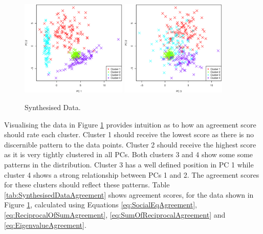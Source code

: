 			\begin{figure}[h!]
				\centering
				\subfloat
				{
					\includegraphics[width=0.45\textwidth]{chapter4/Images/ArtificialData1-2.eps}
					\label{fig:EqualiserDifferencePCA}
				}
				\qquad
				\subfloat
				{
					\includegraphics[width=0.45\textwidth]{chapter4/Images/ArtificialData3-2.eps}
					\label{fig:EqualiserDifferenceCentroidsPCA}
				}
				\caption{Synthesised Data.}
				\label{fig:SynthesisedData}
			\end{figure}

			Visualising the data in Figure \ref{fig:SynthesisedData} provides intuition as to how an agreement
			score should rate each cluster. Cluster 1 should receive the lowest score as there is no
			discernible pattern to the data points. Cluster 2 should receive the highest score as it is very
			tightly clustered in all PCs. Both clusters 3 and 4 show some some patterns in the distribution.
			Cluster 3 has a well defined position in PC 1 while cluster 4 shows a strong relationship between
			PCs 1 and 2. The agreement scores for these clusters should reflect these patterns. Table
			\ref{tab:SynthesisedDataAgreement} shows agreement scores, for the data shown in Figure
			\ref{fig:SynthesisedData}, calculated using Equations \ref{eq:SocialEqAgreement},
			\ref{eq:ReciprocalOfSumAgreement}, \ref{eq:SumOfReciprocalAgreement} and
			\ref{eq:EigenvalueAgreement}.

